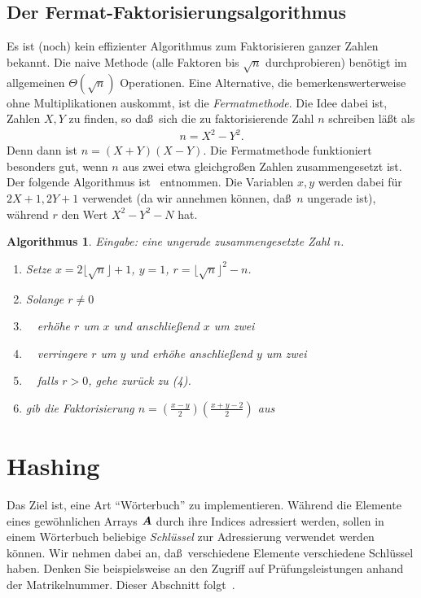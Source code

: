 \documentclass[10pt,reqno]{amsart}
\numberwithin{equation}{section}
\newcommand\vA{\vec A}
\def\vec#1{\mathchoice{\mbox{\boldmath$\displaystyle#1$}}
{\mbox{\boldmath$\textstyle#1$}}
{\mbox{\boldmath$\scriptstyle#1$}}
{\mbox{\boldmath$\scriptscriptstyle#1$}}}
\newtheorem{algorithm}[definition]{Algorithmus}
\newcommand\bc[1]{\left({#1}\right)}
\newcommand\bcfr[2]{\bc{\frac{#1}{#2}}}
\begin{document}
\subsection{Der Fermat-Faktorisierungsalgorithmus}\label{sec_fermat}
Es ist (noch) kein effizienter Algorithmus zum Faktorisieren ganzer Zahlen bekannt.
Die naive Methode (alle Faktoren bis $\sqrt n$ durchprobieren) ben\"otigt im allgemeinen $\Theta(\sqrt n)$ Operationen.
Eine Alternative, die bemerkenswerterweise ohne Multiplikationen auskommt, ist die {\em Fermatmethode}.
Die Idee dabei ist, Zahlen $X,Y$ zu finden, so da\ss\ sich die zu faktorisierende Zahl $n$ schreiben l\"a\ss t als
\begin{align*}
	n=X^2-Y^2.
\end{align*}
Denn dann ist $n=(X+Y)(X-Y)$.
Die Fermatmethode funktioniert besonders gut, wenn $n$ aus zwei etwa gleichgro\ss en Zahlen zusammengesetzt ist.
Der folgende Algorithmus ist~\cite{Knuth} entnommen.
Die Variablen $x,y$ werden dabei f\"ur $2X+1,2Y+1$ verwendet (da wir annehmen k\"onnen, da\ss\ $n$ ungerade ist), w\"ahrend $r$ den Wert $X^2-Y^2-N$ hat.

\begin{algorithm}\label{alg_fermat}
	{\em Eingabe:} eine ungerade zusammengesetzte Zahl $n$.
	\begin{enumerate}
		\item Setze $x=2\lfloor\sqrt n\rfloor+1$, $y=1$, $r=\lfloor\sqrt n\rfloor^2-n$.
		\item Solange $r\neq0$
		\item $\quad$erh\"ohe $r$ um $x$ und anschlie\ss end $x$ um zwei
		\item $\quad$verringere $r$ um $y$ und erh\"ohe anschlie\ss end $y$ um zwei
		\item $\quad$falls $r>0$, gehe zur\"uck zu (4).
		\item gib die Faktorisierung $n=\bcfr{x-y}2\bcfr{x+y-2}2$ aus
	\end{enumerate}
\end{algorithm}

\section{Hashing}\label{sec_hash}

Das Ziel ist, eine Art ``W\"orterbuch'' zu implementieren.
W\"ahrend die Elemente eines gew\"ohnlichen Arrays $\vA$ durch ihre Indices adressiert werden, sollen in einem W\"orterbuch beliebige {\em Schl\"ussel} zur Adressierung verwendet werden k\"onnen.
Wir nehmen dabei an, da\ss\ verschiedene Elemente verschiedene Schl\"ussel haben.
Denken Sie beispielsweise an den Zugriff auf Pr\"ufungsleistungen anhand der Matrikelnummer.
Dieser Abschnitt folgt~\cite{Cormen}.
\end{document}
